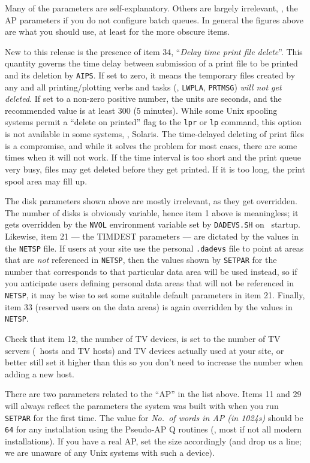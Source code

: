 \medskip\noindent
Many of the parameters are self-explanatory.  Others are largely
irrelevant, \eg, the AP parameters if you do not configure batch queues.
In general the figures above are what you should use, at least for the
more obscure items.

New to this release
is the presence of item 34, ``{\it Delay time print file delete\/}''.
This quantity governs the time delay between submission of a print file to
be printed and its deletion by {\tt AIPS}.  If set to zero, it means the
temporary files created by any and all printing/plotting verbs and tasks
(\eg, {\tt LWPLA}, {\tt PRTMSG}) {\it will not get deleted\/}.  If set to
a non-zero positive number, the units are seconds, and the recommended
value is at least 300 (5 minutes).  While some Unix spooling systems
permit a ``delete on printed'' flag to the {\tt lpr} or {\tt lp} command,
this option is not available in some systems, \eg, Solaris.  The
time-delayed deleting of print files is a compromise, and while it solves
the problem for most cases, there are some times when it will not work.
If the time interval is too short and the print queue very busy, files may
get deleted before they get printed.  If it is too long, the print spool
area may fill up.

The disk parameters shown above are mostly irrelevant, as they get
overridden.  The number of disks is obviously variable, hence item 1 above
is meaningless; it gets overridden by the {\tt NVOL} environment variable
set by {\tt DADEVS.SH} on \ttaips\ startup.  Likewise, item 21 --- the
TIMDEST parameters --- are dictated by the values in the {\tt NETSP} file.
If users at your site use the personal {\tt .dadevs} file to point at
areas that are {\it not\/} referenced in {\tt NETSP}, then the values
shown by {\tt SETPAR} for the number that corresponds to that particular
data area will be used instead, so if you anticipate users defining
personal data areas that will not be referenced in {\tt NETSP}, it may be
wise to set some suitable default parameters in item 21.  Finally, item 33
(reserved users on the data areas) is again overridden by the values in
{\tt NETSP}.

Check that item 12, the number of TV devices, is set to the number of TV
servers (\AIPS\ hosts and TV hosts) and TV devices actually used at your
site, or better still set it higher than this so you don't need to
increase the number when adding a new host.

There are two parameters related to the ``AP'' in the list above.
Items 11 and 29 will always reflect the parameters the system was built
with when you run {\tt SETPAR} for the first time.
The value for {\it No.~of words in AP (in 1024s)\/} should be {\tt 64} for
any installation using the Pseudo-AP Q routines (\ie, most if not all
modern installations).  If you have a real AP, set the size accordingly
(and drop us a line; we are unaware of any Unix systems with such a
device).

